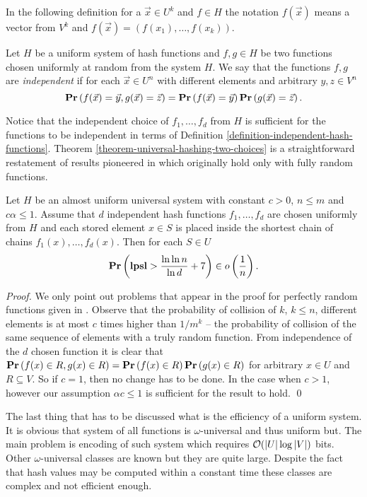 In the following definition for a $\vec{x} \in U^k$ and $f \in H$ the notation $f(\vec{x})$ means a vector from $V^k$ and $f(\vec{x}) = (f(x_1), \dots, f(x_k))$.
\begin{definition}
\label{definition-independent-hash-functions}
Let $H$ be a uniform system of hash functions and $f, g \in H$ be two functions chosen uniformly at random from the system $H$. We say that the functions $f, g$ are \emph{independent} if for each $\vec{x} \in U^n$ with different elements and arbitrary $y, z \in V^n$ $$\mathbf{Pr}\left(f(\vec{x}) = \vec{y}, g(\vec{x}) = \vec{z}\right) = \mathbf{Pr}\left(f(\vec{x}) = \vec{y}\right) \mathbf{Pr}\left(g(\vec{x}) = \vec{z}\right).$$
\end{definition}

Notice that the independent choice of $f_1, \dots, f_d$ from $H$ is sufficient for the functions to be independent in terms of Definition \ref{definition-independent-hash-functions}. Theorem \ref{theorem-universal-hashing-two-choices} is a straightforward restatement of results pioneered in \cite{DBLP:conf/stoc/AzarBKU94} which originally hold only with fully random functions.

\begin{theorem}
\label{theorem-universal-hashing-two-choices}
Let $H$ be an almost uniform universal system with constant $c > 0$, $n \leq m$ and $c \alpha \leq 1$. Assume that $d$ independent hash functions $f_1, \dots, f_d$ are chosen uniformly from $H$ and each stored element $x \in S$ is placed inside the shortest chain of chains $f_1(x), \dots, f_d(x)$. Then for each $S \in U$ $$\mathbf{Pr}\left(\mathbf{lpsl} > \frac{\ln \ln n}{\ln d} + 7\right) \in o\left(\frac{1}{n}\right).$$
\end{theorem}
\begin{proof}
We only point out problems that appear in the proof for perfectly random functions given in \cite{Mitzenmacher:2005:PCR:1076315}. Observe that the probability of collision of $k$, $k \leq n$, different elements is at most $c$ times higher than ${1}/{m^k}$ -- the probability of collision of the same sequence of elements with a truly random function. From independence of the $d$ chosen function it is clear that $\mathbf{Pr}\left(f(x) \in R, g(x) \in R\right) = \mathbf{Pr}\left(f(x) \in R\right)\mathbf{Pr}\left(g(x)\in R\right)$ for arbitrary $x \in U$ and $R \subseteq V$. So if $c = 1$, then no change has to be done. In the case when $c > 1$, however our assumption $\alpha c \leq 1$ is sufficient for the result to hold.
\qed
\end{proof}

The last thing that has to be discussed what is the efficiency of a uniform system. It is obvious that system of all functions is $\omega$-universal and thus uniform but. The main problem is encoding of such system which requires $\mathcal{O}(|U| \log |V|)$ bits. Other $\omega$-universal classes are known but they are quite large. Despite the fact that hash values may be computed within a constant time these classes are complex and not efficient enough. 

